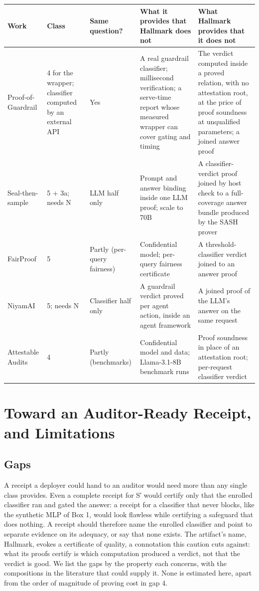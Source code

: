 \documentclass[11pt]{article}
\begin{document}
{\small
\begin{xltabular}{\linewidth}{XXXXX}
\toprule
\textbf{Work} & \textbf{Class} & \textbf{Same question?} & \textbf{What it provides that Hallmark does not} & \textbf{What Hallmark provides that it does not} \\ \midrule
\endhead
Proof-of-Guardrail \cite{B24} & 4 for the wrapper; classifier computed by an external API & Yes & A real guardrail classifier; millisecond verification; a serve-time report whose measured wrapper can cover gating and timing & The verdict computed inside a proved relation, with no attestation root, at the price of proof soundness at unqualified parameters; a joined answer proof \\
Seal-then-sample \cite{A22} & 5 + 3a; needs N & LLM half only & Prompt and answer binding inside one LLM proof; scale to 70B & A classifier-verdict proof joined by host check to a full-coverage answer bundle produced by the SASH prover \\
FairProof \cite{F3} & 5 & Partly (per-query fairness) & Confidential model; per-query fairness certificate & A threshold-classifier verdict joined to an answer proof \\
NiyamAI \cite{A44} & 5; needs N & Classifier half only & A guardrail verdict proved per agent action, inside an agent framework & A joined proof of the LLM's answer on the same request \\
Attestable Audits \cite{B23} & 4 & Partly (benchmarks) & Confidential model and data; Llama-3.1-8B benchmark runs & Proof soundness in place of an attestation root; per-request classifier verdict \\
\bottomrule
\end{xltabular}}

\section{Toward an Auditor-Ready Receipt, and Limitations}

\subsection{Gaps}

A receipt a deployer could hand to an auditor would need more than any single class provides. Even a complete receipt for S′ would certify only that the enrolled classifier ran and gated the answer: a receipt for a classifier that never blocks, like the synthetic MLP of Box 1, would look flawless while certifying a safeguard that does nothing. A receipt should therefore name the enrolled classifier and point to separate evidence on its adequacy, or say that none exists. The artifact's name, Hallmark, evokes a certificate of quality, a connotation this caution cuts against: what its proofs certify is which computation produced a verdict, not that the verdict is good. We list the gaps by the property each concerns, with the compositions in the literature that could supply it. None is estimated here, apart from the order of magnitude of proving cost in gap 4.
\end{document}
